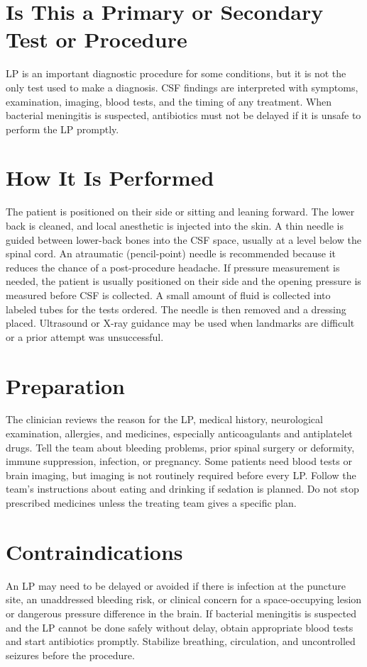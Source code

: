 \section*{Is This a Primary or Secondary Test or Procedure}
LP is an important diagnostic procedure for some conditions, but it is not the only test used to make a diagnosis. CSF findings are interpreted with symptoms, examination, imaging, blood tests, and the timing of any treatment. When bacterial meningitis is suspected, antibiotics must not be delayed if it is unsafe to perform the LP promptly.

\section*{How It Is Performed}
The patient is positioned on their side or sitting and leaning forward. The lower back is cleaned, and local anesthetic is injected into the skin. A thin needle is guided between lower-back bones into the CSF space, usually at a level below the spinal cord. An atraumatic (pencil-point) needle is recommended because it reduces the chance of a post-procedure headache. If pressure measurement is needed, the patient is usually positioned on their side and the opening pressure is measured before CSF is collected. A small amount of fluid is collected into labeled tubes for the tests ordered. The needle is then removed and a dressing placed. Ultrasound or X-ray guidance may be used when landmarks are difficult or a prior attempt was unsuccessful.

\section*{Preparation}
The clinician reviews the reason for the LP, medical history, neurological examination, allergies, and medicines, especially anticoagulants and antiplatelet drugs. Tell the team about bleeding problems, prior spinal surgery or deformity, immune suppression, infection, or pregnancy. Some patients need blood tests or brain imaging, but imaging is not routinely required before every LP. Follow the team's instructions about eating and drinking if sedation is planned. Do not stop prescribed medicines unless the treating team gives a specific plan.

\section*{Contraindications}
An LP may need to be delayed or avoided if there is infection at the puncture site, an unaddressed bleeding risk, or clinical concern for a space-occupying lesion or dangerous pressure difference in the brain. If bacterial meningitis is suspected and the LP cannot be done safely without delay, obtain appropriate blood tests and start antibiotics promptly. Stabilize breathing, circulation, and uncontrolled seizures before the procedure.

